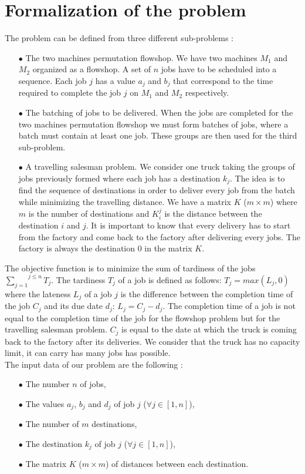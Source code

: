 \documentclass[UTF8, twoside]{EPURapport}
\begin{document}
\chapter{Formalization of the problem}

	The problem can be defined from three different sub-problems :
	
\begin{itemize}
\item[$\bullet$] The two machines permutation flowshop. We have two machines $M_1$ and $M_2$ organized as a flowshop. A set of $n$ jobs have to be scheduled into a sequence. Each job $j$ has a value $a_j$ and $b_j$ that correspond to the time required to complete the job $j$ on $M_1$ and $M_2$ respectively.
\item[$\bullet$] The batching of jobs to be delivered. When the jobs are completed for the two machines permutation flowshop we must form batches of jobs, where a batch must contain at least one job. These groups are then used for the third sub-problem.
\item[$\bullet$] A travelling salesman problem. We consider one truck taking the groups of jobs previously formed where each job has a destination $k_j$. The idea is to find the sequence of destinations in order to deliver every job from the batch while minimizing the travelling distance. We have a matrix $K$ ($m \times m$) where $m$ is the number of destinations and $K_i^j$ is the distance between the destination $i$ and $j$. It is important to know that every delivery has to start from the factory and come back to the factory after delivering every jobs. The factory is always the destination 0 in the matrix $K$.
\end{itemize}

	The objective function is to minimize the sum of tardiness of the jobs $\overset{j \leq n}{\underset{j=1}{\sum}} T_j$. The tardiness $T_j$ of a job is defined as follows: $T_j = max(L_j, 0)$ where the lateness $L_j$  of a job $j$ is the difference between the completion time of the job $C_j$ and its due date $d_j$: $L_j = C_j - d_j$. The completion time of a job is not equal to the completion time of the job for the flowshop problem but for the travelling salesman problem. $C_j$ is equal to the date at which the truck is coming back to the factory after its deliveries.
	We consider that the truck has no capacity limit, it can carry has many jobs has possible.
\\

	The input data of our problem are the following :
\begin{itemize}
\item[$\bullet$] The number $n$ of jobs,
\item[$\bullet$] The values $a_j$, $b_j$ and $d_j$ of job $j$ ($\forall j \in [1,n]$),
\item[$\bullet$] The number of $m$ destinations,
\item[$\bullet$] The destination $k_j$ of job $j$ ($\forall j \in [1,n]$),
\item[$\bullet$] The matrix $K$ ($m \times m$) of distances between each destination.\\
\end{itemize}
\end{document}
